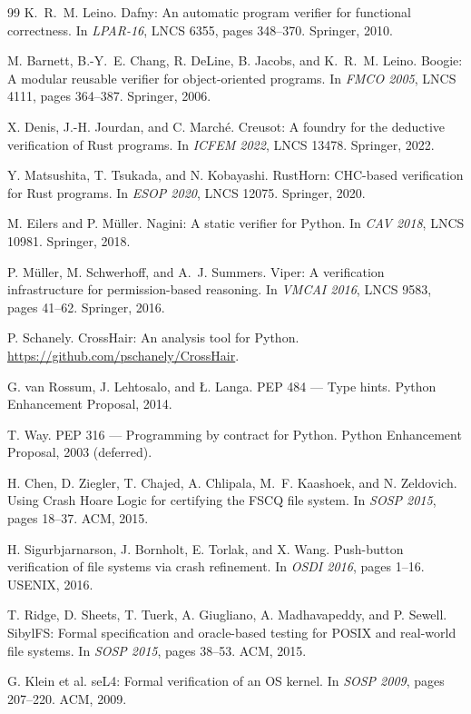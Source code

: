 \documentclass[11pt]{article}
\begin{document}
\begin{thebibliography}{99}
 K.~R.~M. Leino. Dafny: An automatic program verifier for
functional correctness. In \emph{LPAR-16}, LNCS 6355, pages 348--370.
Springer, 2010.

 M. Barnett, B.-Y.~E. Chang, R. DeLine, B. Jacobs, and
K.~R.~M. Leino. Boogie: A modular reusable verifier for object-oriented
programs. In \emph{FMCO 2005}, LNCS 4111, pages 364--387. Springer, 2006.

 X. Denis, J.-H. Jourdan, and C. March\'e. Creusot: A foundry
for the deductive verification of Rust programs. In \emph{ICFEM 2022},
LNCS 13478. Springer, 2022.

 Y. Matsushita, T. Tsukada, and N. Kobayashi. RustHorn:
CHC-based verification for Rust programs. In \emph{ESOP 2020}, LNCS 12075.
Springer, 2020.

 M. Eilers and P. M\"uller. Nagini: A static verifier for
Python. In \emph{CAV 2018}, LNCS 10981. Springer, 2018.

 P. M\"uller, M. Schwerhoff, and A.~J. Summers. Viper: A
verification infrastructure for permission-based reasoning. In
\emph{VMCAI 2016}, LNCS 9583, pages 41--62. Springer, 2016.

 P. Schanely. CrossHair: An analysis tool for Python.
\url{https://github.com/pschanely/CrossHair}.

 G. van Rossum, J. Lehtosalo, and {\L}. Langa. PEP 484 ---
Type hints. Python Enhancement Proposal, 2014.

 T. Way. PEP 316 --- Programming by contract for Python.
Python Enhancement Proposal, 2003 (deferred).

 H. Chen, D. Ziegler, T. Chajed, A. Chlipala, M.~F. Kaashoek,
and N. Zeldovich. Using Crash Hoare Logic for certifying the FSCQ file
system. In \emph{SOSP 2015}, pages 18--37. ACM, 2015.

 H. Sigurbjarnarson, J. Bornholt, E. Torlak, and X. Wang.
Push-button verification of file systems via crash refinement. In
\emph{OSDI 2016}, pages 1--16. USENIX, 2016.

 T. Ridge, D. Sheets, T. Tuerk, A. Giugliano,
A. Madhavapeddy, and P. Sewell. SibylFS: Formal specification and
oracle-based testing for POSIX and real-world file systems. In
\emph{SOSP 2015}, pages 38--53. ACM, 2015.

 G. Klein et al. seL4: Formal verification of an OS kernel.
In \emph{SOSP 2009}, pages 207--220. ACM, 2009.


\end{thebibliography}
\end{document}
